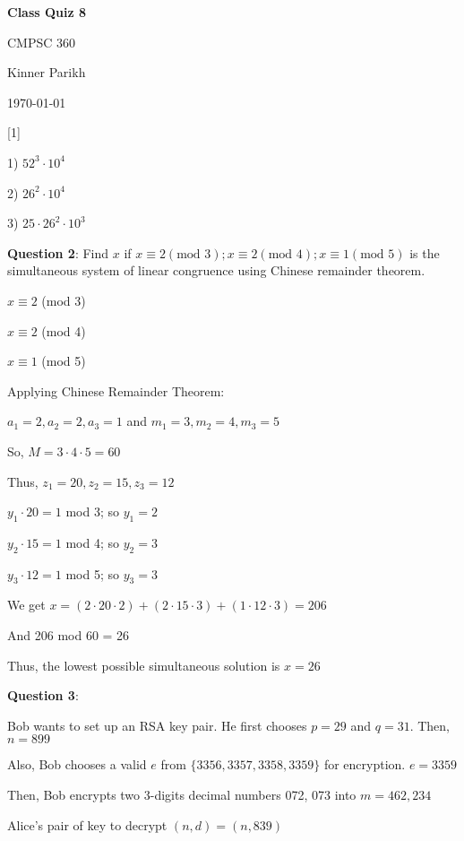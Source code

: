 \documentclass{article} %
\newcommand{\question}[2][]{\begin{flushleft}
        \textbf{Question #1}: #2

\end{flushleft}}
\newcommand{\maketitletwo}[2][]{\begin{center}
        \Large{\textbf{Class Quiz #1}
            
            CMPSC 360} %
        \vspace{5pt}
        
        \normalsize{Kinner Parikh  %
        
        \today}        %
        \vspace{15pt}
        
\end{center}}
\begin{document}
    \maketitletwo[8]  %

    \question[1]{}

    1) $52^3 \cdot 10^4$

    2) $26^2 \cdot 10^4$

    3) $25 \cdot 26^2 \cdot 10^3$


    
    \question[2]{Find $x$ if $x \equiv 2(\text{mod } 3); x \equiv 2(\text{mod } 4);  x \equiv 1(\text{mod } 5)$ is the simultaneous system of 
    linear congruence using Chinese remainder theorem.}

    $x \equiv 2$ (mod 3)
    
    $x \equiv 2$ (mod 4)
    
    $x \equiv 1$ (mod 5)

    Applying Chinese Remainder Theorem:

    $a_1 = 2, a_2 = 2, a_3 = 1$ and $m_1 = 3, m_2 = 4, m_3 = 5$

    So, $M = 3 \cdot 4 \cdot 5 = 60$

    Thus, $z_1 = 20, z_2 = 15, z_3 = 12$

    $y_1 \cdot 20 = 1$ mod 3; so $y_1 = 2$

    $y_2 \cdot 15 = 1$ mod 4; so $y_2 = 3$

    $y_3 \cdot 12 = 1$ mod 5; so $y_3 = 3$

    We get $x = (2 \cdot 20 \cdot 2) + (2 \cdot 15 \cdot 3) + (1 \cdot 12 \cdot 3) = 206$

    And 206 mod 60 = 26

    Thus, the lowest possible simultaneous solution is $x = 26$

    \question[3]{}

    Bob wants to set up an RSA key pair. He first chooses $p=29$ and $q=31$. Then, $n = 899$

    Also, Bob chooses a valid $e$ from $\{3356, 3357, 3358, 3359\}$ for encryption. $e = 3359$

    Then, Bob encrypts two 3-digits decimal numbers 072, 073 into $m=462, 234$

    Alice's pair of key to decrypt $(n, d)=(n,839)$
    
\end{document}
